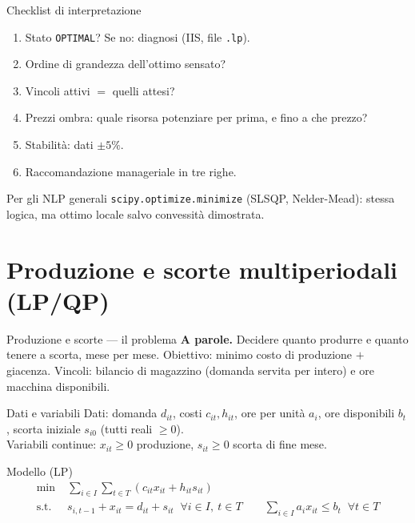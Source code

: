 \documentclass[11pt,aspectratio=169]{beamer}
\begin{document}
\begin{frame}{Checklist di interpretazione}
\begin{enumerate}
  \item Stato \texttt{OPTIMAL}? Se no: diagnosi (IIS, file \texttt{.lp}).
  \item Ordine di grandezza dell'ottimo sensato?
  \item Vincoli attivi $=$ quelli attesi?
  \item Prezzi ombra: quale risorsa potenziare per prima, e fino a che prezzo?
  \item Stabilità: dati $\pm 5\%$.
  \item Raccomandazione manageriale in tre righe.
\end{enumerate}
\begin{block}{Per gli NLP generali}
\texttt{scipy.optimize.minimize} (SLSQP, Nelder-Mead): stessa logica, ma ottimo
\alert{locale} salvo convessità dimostrata.
\end{block}
\end{frame}

\section{Produzione e scorte multiperiodali (LP/QP)}

\begin{frame}{Produzione e scorte --- il problema}
\textbf{A parole.} Decidere quanto produrre e quanto tenere a scorta, mese per mese.
Obiettivo: minimo costo di produzione $+$ giacenza. Vincoli: bilancio di magazzino
(domanda servita per intero) e ore macchina disponibili.
\begin{block}{Dati e variabili}
Dati: domanda $d_{it}$, costi $c_{it}, h_{it}$, ore per unità $a_i$, ore disponibili
$b_t$, scorta iniziale $s_{i0}$ (tutti reali $\ge 0$).\\
Variabili continue: $x_{it} \ge 0$ produzione, $s_{it} \ge 0$ scorta di fine mese.
\end{block}
\begin{block}{Modello (LP)}
\vspace{-2ex}
\begin{align*}
\min\;& \sum_{i \in I}\sum_{t \in T} ( c_{it} x_{it} + h_{it} s_{it} ) \\
\text{s.t.}\;\; & s_{i,t-1} + x_{it} = d_{it} + s_{it} \;\; \forall i \in I,\ t \in T
\qquad \textstyle\sum_{i \in I} a_i x_{it} \le b_t \;\; \forall t \in T
\end{align*}
\end{block}
\end{frame}
\end{document}
